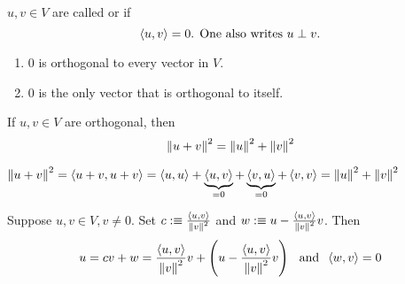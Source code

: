 \setcounter{thm}{9}
\begin{mydef}[orthogonal]
  $u,v \in V$ are called  or  if 
  \begin{equation}
    \ip{u}{v} =0$. One also writes $u \perp v.
  \end{equation}
\end{mydef}

\begin{thm} 
  \begin{enumerate}[label=(\alph*)]
    \item $0$ is orthogonal to every vector in $V$.
    \item $0$ is the only vector that is orthogonal to itself.
  \end{enumerate}
\end{thm}

\begin{thm}
  If $u,v \in V$ are orthogonal, then
  \begin{equation}
    \left \lVert u+v \right \rVert^2 = \left \lVert u \right \rVert^2 + \left \lVert v \right \rVert^2
  \end{equation}
\end{thm}
\begin{prf} 
  $\left \lVert u+v \right \rVert^2 = \left \langle u+v, u+v \right \rangle = \left \langle u, u \right \rangle + \underbrace{\left \langle u, v \right \rangle}_{=0} + \underbrace{\left \langle v, u \right \rangle}_{=0} + \left \langle v, v \right \rangle = \left \lVert u \right \rVert^2 + \left \lVert v \right \rVert^2 $
\end{prf}

\setcounter{thm}{12}
\begin{thm}
  \label{thm: an orthogonal decomposition}
  Suppose $u,v \in V, v\neq 0.$ Set $c :\equiv \frac{\left \langle u, v \right \rangle}{\left \lVert v \right \rVert^2}$ and $w :\equiv u-\frac{\left \langle u, v \right \rangle}{\left \lVert v \right \rVert^2}v$. Then
  \begin{equation}
    u = cv+w = \frac{\left \langle u, v \right \rangle}{\left \lVert v \right \rVert^2} v + \left( u- \frac{\left \langle u, v \right \rangle}{\left \lVert v \right \rVert^2} v \right  ) \;\;\, \text{and}\;\; \left \langle w, v \right \rangle=0
  \end{equation}
\end{thm}

